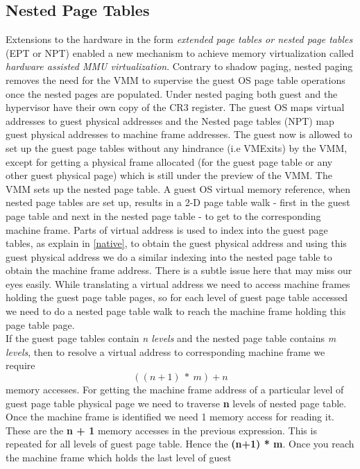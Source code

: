 \subsection{Nested Page Tables} \label{nested}
Extensions to the hardware in the form \textit{extended page tables or nested page tables} (EPT or
NPT) enabled a new mechanism to achieve memory virtualization called \textit{hardware assisted MMU
virtualization}. Contrary to shadow paging, nested paging removes the need for the VMM to
supervise the guest OS page table operations once the nested pages are populated. Under nested
paging both guest and the hypervisor have their own copy of the CR3 register. The guest OS maps
virtual addresses to guest physical addresses and the Nested page tables (NPT) map guest physical
addresses to machine frame addresses. The guest now is allowed to set up the guest page tables
without any hindrance (i.e VMExits) by the VMM, except for getting a physical frame allocated (for
the guest page table or any other guest physical page) which is still under the preview of the
VMM. The VMM sets up the nested page table. A guest OS virtual memory reference, when nested page
tables are set up, results in a 2-D page table walk - first in the guest page table and next in
the nested page table - to get to the corresponding machine frame. Parts of virtual address is
used to index into the guest page tables, as explain in \ref{native}, to obtain the guest physical
address and using this guest physical address we do a similar indexing into the nested page table
to obtain the machine frame address. There is a subtle issue here that may miss our eyes easily.
While translating a virtual address we need to access machine frames holding the guest page table
pages, so for each level of guest page table accessed we need to do a nested page table walk to
reach the machine frame holding this page table page.\\
If the guest page tables contain \textit{n levels} and the nested page table contains \textit{m
levels}, then to resolve a virtual address to corresponding machine frame we require \[((n+1)\ *\
m) + n\] memory accesses\citet{gandhi2014efficient}.
For getting the machine frame address of a particular level of guest
page table physical page we need to traverse \textbf{n} levels of nested page table. Once the
machine frame is identified we need 1 memory access for reading it. These are the \textbf{n + 1}
memory accesses in the previous expression. This is repeated for all levels of guest page table.
Hence the \textbf{(n+1) * m}. Once you reach the machine frame which holds the last level of guest
